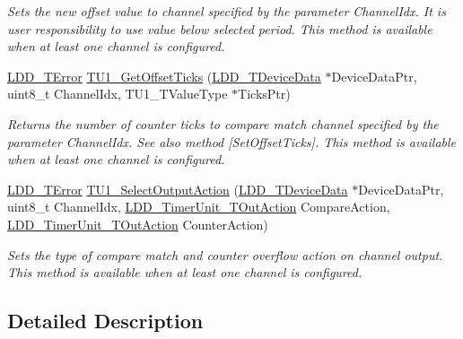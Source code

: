 \begin{DoxyCompactItemize}
\begin{DoxyCompactList}\small\item\em Sets the new offset value to channel specified by the parameter Channel\+Idx. It is user responsibility to use value below selected period. This method is available when at least one channel is configured. \end{DoxyCompactList}\item 
\hyperlink{group___p_e___types__module_ga24c2b045fd04e79e85f261ce4df35588}{L\+D\+D\+\_\+\+T\+Error} \hyperlink{group___t_u1__module_ga92c04b5447fde657da71680968acd784}{T\+U1\+\_\+\+Get\+Offset\+Ticks} (\hyperlink{group___p_e___types__module_gac5cf1362f1f0e3a2ce71b1bf2276d091}{L\+D\+D\+\_\+\+T\+Device\+Data} $\ast$Device\+Data\+Ptr, uint8\+\_\+t Channel\+Idx, T\+U1\+\_\+\+T\+Value\+Type $\ast$Ticks\+Ptr)
\begin{DoxyCompactList}\small\item\em Returns the number of counter ticks to compare match channel specified by the parameter Channel\+Idx. See also method \mbox{[}Set\+Offset\+Ticks\mbox{]}. This method is available when at least one channel is configured. \end{DoxyCompactList}\item 
\hyperlink{group___p_e___types__module_ga24c2b045fd04e79e85f261ce4df35588}{L\+D\+D\+\_\+\+T\+Error} \hyperlink{group___t_u1__module_ga69e314f91fe2ea96524ce0c389505b6b}{T\+U1\+\_\+\+Select\+Output\+Action} (\hyperlink{group___p_e___types__module_gac5cf1362f1f0e3a2ce71b1bf2276d091}{L\+D\+D\+\_\+\+T\+Device\+Data} $\ast$Device\+Data\+Ptr, uint8\+\_\+t Channel\+Idx, \hyperlink{group___p_e___types__module_ga2c05e6e8b549483727170a429c03425e}{L\+D\+D\+\_\+\+Timer\+Unit\+\_\+\+T\+Out\+Action} Compare\+Action, \hyperlink{group___p_e___types__module_ga2c05e6e8b549483727170a429c03425e}{L\+D\+D\+\_\+\+Timer\+Unit\+\_\+\+T\+Out\+Action} Counter\+Action)
\begin{DoxyCompactList}\small\item\em Sets the type of compare match and counter overflow action on channel output. This method is available when at least one channel is configured. \end{DoxyCompactList}\end{DoxyCompactItemize}


\subsection{Detailed Description}


